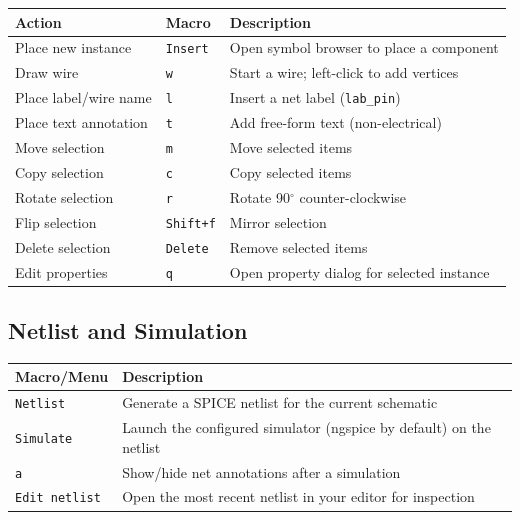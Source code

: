 \documentclass[11pt]{article}
\begin{document}
\begin{center}
\begin{tabular}{@{}lll@{}}
\toprule
\textbf{Action}            & \textbf{Macro}    & \textbf{Description} \\
\midrule
Place new instance         & \texttt{Insert}   & Open symbol browser to
                                                 place a component \\
Draw wire                  & \texttt{w}        & Start a wire; left-click
                                                 to add vertices \\
Place label/wire name      & \texttt{l}        & Insert a net label
                                                 (\texttt{lab\_pin}) \\
Place text annotation      & \texttt{t}        & Add free-form text
                                                 (non-electrical) \\
Move selection             & \texttt{m}        & Move selected items \\
Copy selection             & \texttt{c}        & Copy selected items \\
Rotate selection           & \texttt{r}        & Rotate 90$^\circ$
                                                 counter-clockwise \\
Flip selection             & \texttt{Shift+f}  & Mirror selection \\
Delete selection           & \texttt{Delete}   & Remove selected items \\
Edit properties            & \texttt{q}        & Open property dialog
                                                 for selected instance \\
\bottomrule
\end{tabular}
\end{center}

\subsection{Netlist and Simulation}

\begin{center}
\begin{tabular}{@{}lp{9.5cm}@{}}
\toprule
\textbf{Macro/Menu}         & \textbf{Description} \\
\midrule
\texttt{Netlist}            & Generate a SPICE netlist for the current
                              schematic \\
\texttt{Simulate}           & Launch the configured simulator (ngspice
                              by default) on the netlist \\
\texttt{a}                  & Show/hide net annotations after a
                              simulation \\
\texttt{Edit netlist}       & Open the most recent netlist in your
                              editor for inspection \\
\bottomrule
\end{tabular}
\end{center}
\end{document}
